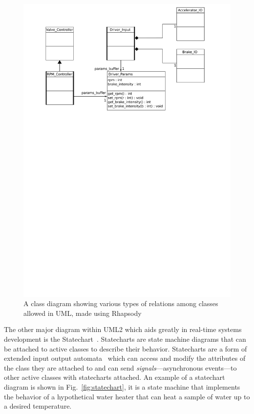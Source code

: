 \begin{figure}
\centering
\includegraphics[scale=0.75]{figs/class_diag}
\caption{A class diagram showing various types of relations among
  classes allowed in UML, made using Rhapsody}
\label{fig:class_diag}
\end{figure}

The other major diagram within UML2 which aids greatly in real-time
systems development is the Statechart~\cite{jansamak@acsc04,
  allen@sigplan95}. Statecharts are state machine diagrams that can be
attached to active classes to describe their behavior. Statecharts are
a form of extended input output automata~\cite{lynch@concur01} which
can access and modify the attributes of the class they are attached to
and can send \emph{signals}---asynchronous events---to other active
classes with statecharts attached. An example of a statechart diagram
is shown in Fig.~\ref{fig:statechart}, it is a state machine that
implements the behavior of a hypothetical water heater that can heat a
sample of water up to a desired temperature.

